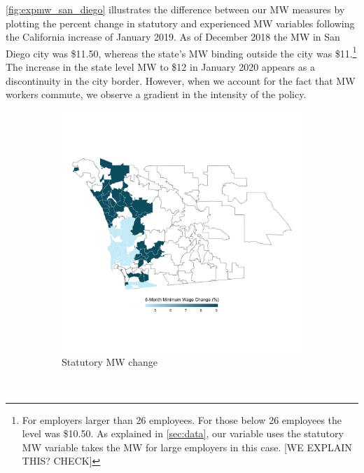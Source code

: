 \autoref{fig:expmw_san_diego} illustrates the difference between our MW measures by plotting 
the percent change in statutory and experienced MW variables following the California 
increase of January 2019. As of December 2018 the MW in San Diego city was \$11.50, 
whereas the state's MW binding outside the city was \$11.\footnote{For employers larger 
	than 26 employees. For those below 26 employees the level was \$10.50. As explained in 
	\autoref{sec:data}, our variable uses the statutory MW variable takes the MW for
	large employers in this case. [WE EXPLAIN THIS? CHECK]}
The increase in the state level MW to \$12 in January 2020 appears as a discontinuity in the 
city border. However, when we account for the fact that MW workers commute, we observe a 
gradient in the intensity of the policy.

\begin{figure}
	\caption{The California MW Increase of January 2019 in San Diego}
	\label{fig:expmw_san_diego}
	\centering
	\begin{subfigure}[b]{0.65\textwidth}
		\caption{Statutory MW change}
		\includegraphics[width = \textwidth]
		{../../analysis/descriptive_maps/output/San_Diego_mw_msa.png}
	\end{subfigure}\\
	\begin{subfigure}[b]{0.65\textwidth}

\end{subfigure}
\end{figure}

